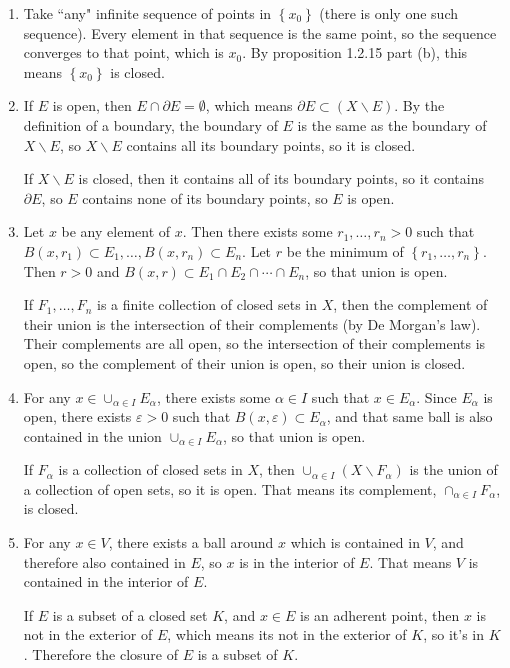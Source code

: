 \documentclass{article}
\begin{document}
\begin{enumerate}[label=(\alph*)]
    \item Take ``any" infinite sequence of points in $ \left\{ x_0 \right\}$ (there is only one such sequence). Every element in that sequence is the same point, so the sequence converges to that point, which is $x_0$. By proposition 1.2.15 part (b), this means $ \left\{ x_0 \right\}$ is closed.
    \item If $E$ is open, then $E \cap \partial E = \emptyset$, which means $\partial E \subset (X \backslash E)$. By the definition of a boundary, the boundary of $E$ is the same as the boundary of $X \backslash E$, so $X \backslash E$ contains all its boundary points, so it is closed.
        \par
        If $X \backslash E$ is closed, then it contains all of its boundary points, so it contains $\partial E$, so $E$ contains none of its boundary points, so $E$ is open.
    \item Let $x$ be any element of $x$. Then there exists some $r_1, \dots, r_n > 0$ such that $B(x, r_1) \subset E_1, \dots, B(x, r_n) \subset E_n$. Let $r$ be the minimum of $ \left\{ r_1, \dots, r_n \right\}$. Then $r>0$ and $B(x, r) \subset E_1 \cap E_2 \cap \cdots \cap E_n$, so that union is open.
        \par
        If $F_1, \dots, F_n$ is a finite collection of closed sets in $X$, then the complement of their union is the intersection of their complements (by De Morgan's law). Their complements are all open, so the intersection of their complements is open, so the complement of their union is open, so their union is closed.
    \item For any $x \in \cup_{\alpha \in I} E_\alpha$, there exists some $\alpha \in I$ such that $x \in E_\alpha$. Since $E_\alpha$ is open, there exists $\varepsilon > 0$ such that $B(x, \varepsilon) \subset E_\alpha$, and that same ball is also contained in the union $\cup_{\alpha \in I} E_\alpha$, so that union is open.
        \par
        If $F_\alpha$ is a collection of closed sets in $X$, then $\cup_{\alpha \in I} (X \backslash F_\alpha)$ is the union of a collection of open sets, so it is open. That means its complement, $\cap_{\alpha \in I} F_\alpha$, is closed.
    \item For any $x \in V$, there exists a ball around $x$ which is contained in $V$, and therefore also contained in $E$, so $x$ is in the interior of $E$. That means $V$ is contained in the interior of $E$.
        \par
        If $E$ is a subset of a closed set $K$, and $x \in E$ is an adherent point, then $x$ is not in the exterior of $E$, which means its not in the exterior of $K$, so it's in $K$. Therefore the closure of $E$ is a subset of $K$.
\end{enumerate}
\end{document}
